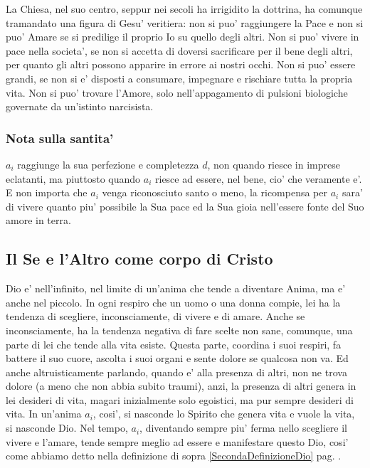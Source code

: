 La Chiesa, nel suo centro, seppur nei secoli ha irrigidito la dottrina, ha comunque tramandato una figura di Gesu' veritiera: non si puo' raggiungere la Pace e non si puo' Amare se si predilige il proprio Io su quello degli altri. Non si puo' vivere in pace nella societa', se non si accetta di doversi sacrificare per il bene degli altri, per quanto gli altri possono apparire in errore ai nostri occhi. Non si puo' essere grandi, se non si e' disposti a consumare, impegnare e rischiare tutta la propria vita. Non si puo' trovare l'Amore, solo nell'appagamento di pulsioni biologiche governate da un'istinto narcisista.

\subsubsection{Nota sulla santita'}
$a_i$ raggiunge la sua perfezione e completezza $d$, non quando riesce in imprese eclatanti, ma piuttosto quando $a_i$ riesce ad essere, nel bene, cio' che veramente e'. E non importa che $a_i$ venga riconosciuto santo o meno, la ricompensa per $a_i$ sara' di vivere quanto piu' possibile la Sua pace ed la Sua gioia nell'essere fonte del Suo amore in terra.

\subsection{Il Se e l'Altro come corpo di Cristo}

Dio e' nell'infinito, nel limite di un'anima che tende a diventare Anima, ma e' anche nel piccolo.
 In ogni respiro che un uomo o una donna compie, lei ha la tendenza di scegliere, inconsciamente, di vivere e di amare. Anche se inconsciamente, ha la tendenza negativa di fare scelte non sane, comunque, una parte di lei che tende alla vita esiste. Questa parte, coordina i suoi respiri, fa battere il suo cuore, ascolta i suoi organi e sente dolore se qualcosa non va. Ed anche altruisticamente parlando, quando e' alla presenza di altri, non ne trova dolore (a meno che non abbia subito traumi), anzi, la presenza di altri genera in lei desideri di vita, magari inizialmente solo egoistici, ma pur sempre desideri di vita.
In un'anima $a_i$, cosi', si nasconde lo Spirito che genera vita e vuole la vita, si nasconde Dio. Nel tempo, $a_i$, diventando sempre piu' ferma nello scegliere il vivere e l'amare, tende sempre meglio ad essere e manifestare questo Dio, cosi' come abbiamo detto nella definizione di sopra \ref{SecondaDefinizioneDio} pag. \pageref{SecondaDefinizioneDio}.


